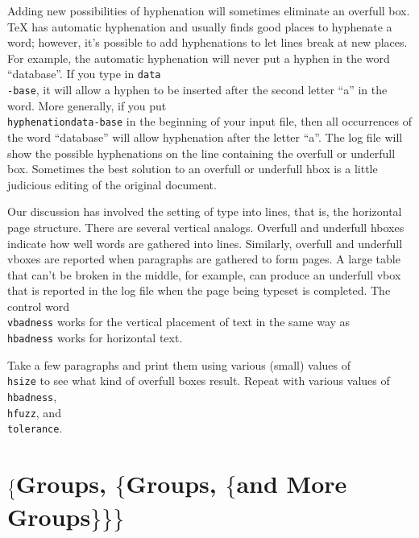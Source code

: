 Adding new possibilities of hyphenation will sometimes eliminate 
an overfull box. \TeX{} has automatic hyphenation and usually 
finds good places to hyphenate a word; however, it's possible to 
add hyphenations to let lines break at new places.  For example, 
the automatic hyphenation will never put a hyphen in the word 
``database''.  If you type in {\tt data\\-base}, it will allow a 
hyphen to be inserted after the second letter ``a'' in the word. 
More generally, if you put {\tt \\hyphenation\lb data-base\rb} in 
the beginning of your input file, then all occurrences of the 
word ``database'' will allow hyphenation after the letter ``a''. 
 The log file will show the possible hyphenations on 
the line containing the overfull or underfull box. Sometimes the 
best solution to an overfull or underfull hbox is a little 
judicious editing of the original document. 

Our discussion has involved the setting of type into lines, that is, 
the horizontal page structure.  There are several vertical analog{}s. 
Overfull and underfull hboxes indicate how well words are gathered 
into lines.  Similarly, overfull and underfull vboxes are reported 
when paragraphs are gathered to form pages.  A large table that 
can't be broken in the middle, for example, can produce an underfull 
vbox that is reported in the log file when the page being typeset is 
completed.  The control word {\tt \\vbadness} works for the vertical 
placement of text in the same way as {\tt \\hbadness} works for 
horizontal text. 

\exercise Take a few paragraphs and print them using various (small) 
values of {\tt \\hsize} to see what kind of overfull boxes result. 
Repeat with various values of {\tt \\hbadness}, {\tt \\hfuzz}, and 
{\tt \\tolerance}. 






\section{$\Bigl\{$Groups, $\bigl\{$Groups, 
        $\{$and More Groups$\}\bigr\}\Bigr\}$} 

